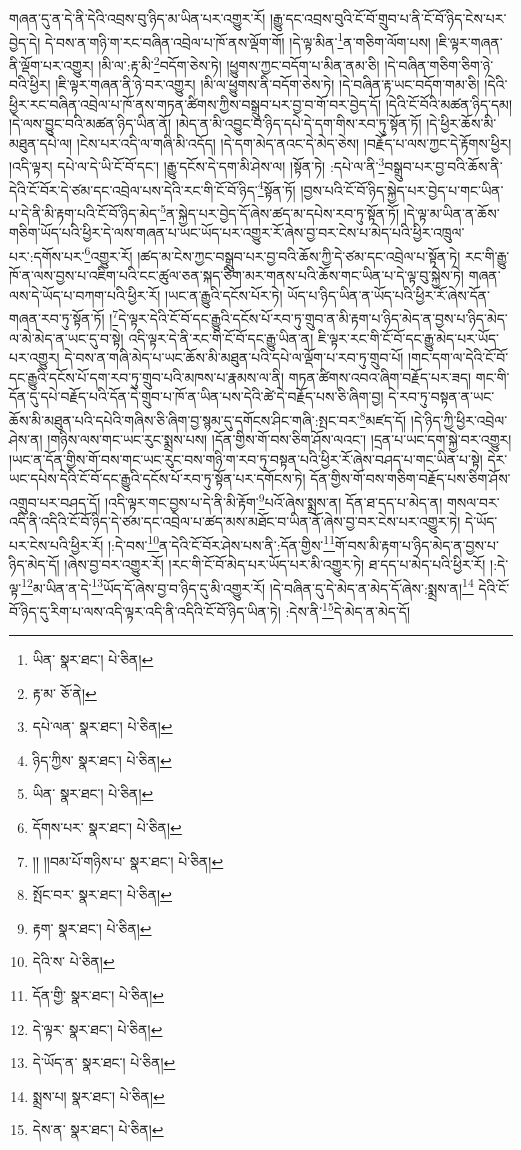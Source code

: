 གཞན་དུ་ན་དེ་ནི་དེའི་འབྲས་བུ་ཉིད་མ་ཡིན་པར་འགྱུར་རོ། །རྒྱུ་དང་འབྲས་བུའི་ངོ་བོ་གྲུབ་པ་ནི་ངོ་བོ་ཉིད་ངེས་པར་བྱེད་དེ། དེ་བས་ན་གཉི་ག་རང་བཞིན་འབྲེལ་པ་ཁོ་ནས་ལྡོག་གོ། །དེ་ལྟ་མིན་\footnote{ཡིན་  སྣར་ཐང་།  པེ་ཅིན། }ན་གཅིག་ལོག་པས། །ཇི་ལྟར་གཞན་ནི་ལྡོག་པར་འགྱུར། །མི་ལ་:རྟ་མི་\footnote{རྟ་མ་  ཅོ་ནེ། }བདོག་ཅེས་ཏེ། །ཕྱུགས་ཀྱང་བདོག་པ་མིན་ནམ་ཅི། །དེ་བཞིན་གཅིག་ཅིག་ཉེ་བའི་ཕྱིར། །ཇི་ལྟར་གཞན་ནི་ཉེ་བར་འགྱུར། །མི་ལ་ཕྱུགས་ནི་བདོག་ཅེས་ཏེ། །དེ་བཞིན་རྟ་ཡང་བདོག་གམ་ཅི། །དེའི་ཕྱིར་རང་བཞིན་འབྲེལ་པ་ཁོ་ནས་གཏན་ཚིགས་ཀྱིས་བསྒྲུབ་པར་བྱ་བ་གོ་བར་བྱེད་དོ། །དེའི་ངོ་བོའི་མཚན་ཉིད་དམ། །དེ་ལས་བྱུང་བའི་མཚན་ཉིད་ཡིན་ནོ། །མེད་ན་མི་འབྱུང་བ་ཉིད་དཔེ་དེ་དག་གིས་རབ་ཏུ་སྟོན་ཏོ། །དེ་ཕྱིར་ཆོས་མི་མཐུན་དཔེ་ལ། །ངེས་པར་འདི་ལ་གཞི་མི་འདོད། །དེ་དག་མེད་ནའང་དེ་མེད་ཅེས། །བརྗོད་པ་ལས་ཀྱང་དེ་རྟོགས་ཕྱིར། །འདི་ལྟར། དཔེ་ལ་དེ་ཡི་ངོ་བོ་དང་། །རྒྱུ་དངོས་དེ་དག་མི་ཤེས་ལ། །སྟོན་ཏེ། :དཔེ་ལ་ནི་\footnote{དཔེ་ལན་  སྣར་ཐང་།  པེ་ཅིན། }བསྒྲུབ་པར་བྱ་བའི་ཆོས་ནི་དེའི་ངོ་བོར་དེ་ཙམ་དང་འབྲེལ་པས་དེའི་རང་གི་ངོ་བོ་ཉིད་\footnote{ཉིད་ཀྱིས་  སྣར་ཐང་།  པེ་ཅིན། }སྟོན་ཏོ། །བྱས་པའི་ངོ་བོ་ཉིད་སྐྱེད་པར་བྱེད་པ་གང་ཡིན་པ་དེ་ནི་མི་རྟག་པའི་ངོ་བོ་ཉིད་མེད་\footnote{ཡིན་  སྣར་ཐང་།  པེ་ཅིན། }ན་སྐྱེད་པར་བྱེད་དོ་ཞེས་ཚད་མ་དཔེས་རབ་ཏུ་སྟོན་ཏོ། །དེ་ལྟ་མ་ཡིན་ན་ཆོས་གཅིག་ཡོད་པའི་ཕྱིར་དེ་ལས་གཞན་པ་ཡང་ཡོད་པར་འགྱུར་རོ་ཞེས་བྱ་བར་ངེས་པ་མེད་པའི་ཕྱིར་འཁྲུལ་པར་:དགོས་པར་\footnote{དོགས་པར་  སྣར་ཐང་།  པེ་ཅིན། }འགྱུར་རོ། །ཚད་མ་ངེས་ཀྱང་བསྒྲུབ་པར་བྱ་བའི་ཆོས་ཀྱི་དེ་ཙམ་དང་འབྲེལ་པ་སྟོན་ཏེ། རང་གི་རྒྱུ་ཁོ་ན་ལས་བྱས་པ་འཇིག་པའི་ངང་ཚུལ་ཅན་སྐད་ཅིག་མར་གནས་པའི་ཆོས་གང་ཡིན་པ་དེ་ལྟ་བུ་སྐྱེས་ཏེ། གཞན་ལས་དེ་ཡོད་པ་བཀག་པའི་ཕྱིར་རོ། །ཡང་ན་རྒྱུའི་དངོས་པོར་ཏེ། ཡོད་པ་ཉིད་ཡིན་ན་ཡོད་པའི་ཕྱིར་རོ་ཞེས་དོན་གཞན་རབ་ཏུ་སྟོན་ཏོ། །\footnote{།། །།བམ་པོ་གཉིས་པ་  སྣར་ཐང་།  པེ་ཅིན། }དེ་ལྟར་དེའི་ངོ་བོ་དང་རྒྱུའི་དངོས་པོ་རབ་ཏུ་གྲུབ་ན་མི་རྟག་པ་ཉིད་མེད་ན་བྱས་པ་ཉིད་མེད་ལ་མེ་མེད་ན་ཡང་དུ་བ་སྟེ། འདི་ལྟར་དེ་ནི་རང་གི་ངོ་བོ་དང་རྒྱུ་ཡིན་ན། ཇི་ལྟར་རང་གི་ངོ་བོ་དང་རྒྱུ་མེད་པར་ཡོད་པར་འགྱུར། དེ་བས་ན་གཞི་མེད་པ་ཡང་ཆོས་མི་མཐུན་པའི་དཔེ་ལ་ལྡོག་པ་རབ་ཏུ་གྲུབ་པོ། །གང་དག་ལ་དེའི་ངོ་བོ་དང་རྒྱུའི་དངོས་པོ་དག་རབ་ཏུ་གྲུབ་པའི་མཁས་པ་རྣམས་ལ་ནི། གཏན་ཚིགས་འབའ་ཞིག་བརྗོད་པར་ཟད། གང་གི་དོན་དུ་དཔེ་བརྗོད་པའི་དོན་དེ་གྲུབ་པ་ཁོ་ན་ཡིན་པས་དེའི་ཚེ་དེ་བརྗོད་པས་ཅི་ཞིག་བྱ། དེ་རབ་ཏུ་བསྟན་ན་ཡང་ཆོས་མི་མཐུན་པའི་དཔེའི་གཞིས་ཅི་ཞིག་བྱ་སྙམ་དུ་དགོངས་ཤིང་གཞི་:སྤང་བར་\footnote{སྤོང་བར་  སྣར་ཐང་།  པེ་ཅིན། }མཛད་དོ། །དེ་ཉིད་ཀྱི་ཕྱིར་འབྲེལ་ཤེས་ན། །གཉིས་ལས་གང་ཡང་རུང་སྨྲས་པས། །དོན་གྱིས་གོ་བས་ཅིག་ཤོས་ལའང་། །དྲན་པ་ཡང་དག་སྐྱེ་བར་འགྱུར། །ཡང་ན་དོན་གྱིས་གོ་བས་གང་ཡང་རུང་བས་གཉི་ག་རབ་ཏུ་བསྟན་པའི་ཕྱིར་རོ་ཞེས་བཤད་པ་གང་ཡིན་པ་སྟེ། དེར་ཡང་དཔེས་དེའི་ངོ་བོ་དང་རྒྱུའི་དངོས་པོ་རབ་ཏུ་སྟོན་པར་དགོངས་ཏེ། དོན་གྱིས་གོ་བས་གཅིག་བརྗོད་པས་ཅིག་ཤོས་འགྲུབ་པར་བཤད་དོ། །འདི་ལྟར་གང་བྱས་པ་དེ་ནི་མི་རྟོག་\footnote{རྟག་  སྣར་ཐང་།  པེ་ཅིན། }པའོ་ཞེས་སྨྲས་ན། དོན་ཐ་དད་པ་མེད་ན། གསལ་བར་འདི་ནི་འདིའི་ངོ་བོ་ཉིད་དེ་ཙམ་དང་འབྲེལ་པ་ཚད་མས་མཐོང་བ་ཡིན་ནོ་ཞེས་བྱ་བར་ངེས་པར་འགྱུར་ཏེ། དེ་ཡོད་པར་ངེས་པའི་ཕྱིར་རོ། །:དེ་བས་\footnote{དེའི་ས་  པེ་ཅིན། }ན་དེའི་ངོ་བོར་ཤེས་པས་ནི་:དོན་གྱིས་\footnote{དོན་གྱི་  སྣར་ཐང་།  པེ་ཅིན། }གོ་བས་མི་རྟག་པ་ཉིད་མེད་ན་བྱས་པ་ཉིད་མེད་དོ། །ཞེས་བྱ་བར་འགྱུར་རོ། །རང་གི་ངོ་བོ་མེད་པར་ཡོད་པར་མི་འགྱུར་ཏེ། ཐ་དད་པ་མེད་པའི་ཕྱིར་རོ། །:དེ་ལྟ་\footnote{དེ་ལྟར་  སྣར་ཐང་།  པེ་ཅིན། }མ་ཡིན་ན་དེ་\footnote{དེ་ཡོད་ན་  སྣར་ཐང་།  པེ་ཅིན། }ཡོད་དོ་ཞེས་བྱ་བ་ཉིད་དུ་མི་འགྱུར་རོ། །དེ་བཞིན་དུ་དེ་མེད་ན་མེད་དོ་ཞེས་:སྨྲས་ན།\footnote{སྨྲས་པ།  སྣར་ཐང་།  པེ་ཅིན། } དེའི་ངོ་བོ་ཉིད་དུ་རིག་པ་ལས་འདི་ལྟར་འདི་ནི་འདིའི་ངོ་བོ་ཉིད་ཡིན་ཏེ། :དེས་ནི་\footnote{དེས་ན་  སྣར་ཐང་།  པེ་ཅིན། }དེ་མེད་ན་མེད་དོ། 